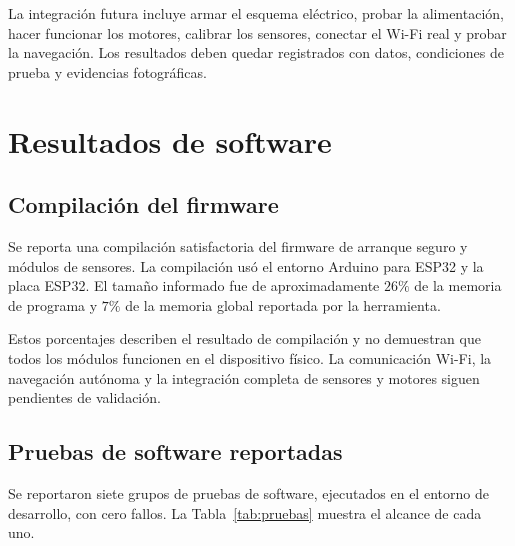 \documentclass[journal]{IEEEtran}
\begin{document}
La integración futura incluye armar el esquema eléctrico, probar la alimentación, hacer funcionar los motores, calibrar los sensores, conectar el Wi-Fi real y probar la navegación. Los resultados deben quedar registrados con datos, condiciones de prueba y evidencias fotográficas.


\section{Resultados de software}

\subsection{Compilación del firmware}

Se reporta una compilación satisfactoria del firmware de arranque seguro y módulos de sensores. La compilación usó el entorno Arduino para ESP32 y la placa ESP32. El tamaño informado fue de aproximadamente $26\%$ de la memoria de programa y $7\%$ de la memoria global reportada por la herramienta.

Estos porcentajes describen el resultado de compilación y no demuestran que todos los módulos funcionen en el dispositivo físico. La comunicación Wi-Fi, la navegación autónoma y la integración completa de sensores y motores siguen pendientes de validación.

\subsection{Pruebas de software reportadas}

Se reportaron siete grupos de pruebas de software, ejecutados en el entorno de desarrollo, con cero fallos. La Tabla~\ref{tab:pruebas} muestra el alcance de cada uno.
\end{document}

